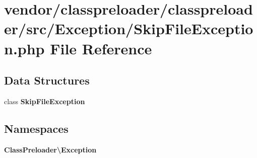 \section{vendor/classpreloader/classpreloader/src/\+Exception/\+Skip\+File\+Exception.php File Reference}
\label{_skip_file_exception_8php}
\subsection*{Data Structures}
\begin{DoxyCompactItemize}
\item 
class {\bf Skip\+File\+Exception}
\end{DoxyCompactItemize}
\subsection*{Namespaces}
\begin{DoxyCompactItemize}
\item 
 {\bf Class\+Preloader\textbackslash{}\+Exception}
\end{DoxyCompactItemize}
